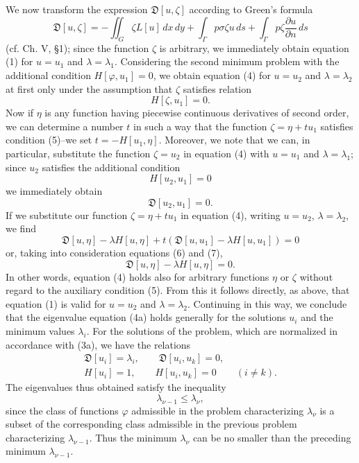 We now transform the expression $\mathfrak D[u,\zeta]$ according to Green's formula
\[
\mathfrak D[u,\zeta]=-
\iint_G \zeta L[u] \,dx\,dy
+\int_\Gamma p\sigma\zeta u\,ds
+\int_\Gamma p\zeta\frac{\partial u}{\partial n}\,ds
\]
(cf. Ch. V, \S1); since the function $\zeta$ is arbitrary, we immediately obtain equation (1) for $u=u_1$ and $\lambda=\lambda_1$. Considering the second minimum problem with the additional condition $H[\varphi,u_1]=0$, we obtain equation (4) for $u=u_2$ and $\lambda=\lambda_2$ at first only under the assumption that $\zeta$ satisfies relation
\begin{equation}\tag{5}
H[\zeta,u_1]=0.
\end{equation}
Now if $\eta$ is any function having piecewise continuous derivatives of second order, we can determine a number $t$ in such a way that the function $\zeta=\eta+tu_1$ satisfies condition (5)--we set $t=-H[u_1,\eta]$. Moreover, we note that we can, in particular, substitute the function $\zeta=u_2$ in equation (4) with $u=u_1$ and $\lambda=\lambda_1$; since $u_2$ satisfies the additional condition
\begin{equation}\tag{6}
H[u_2,u_1]=0
\end{equation}
we immediately obtain
\begin{equation}\tag{7}
\mathfrak D[u_2,u_1]=0.
\end{equation}
If we substitute our function $\zeta=\eta+tu_1$ in equation (4), writing $u=u_2$, $\lambda=\lambda_2$, we find
\[
\mathfrak D[u,\eta]-\lambda H[u,\eta]
+t(\mathfrak D[u,u_1]-\lambda H[u,u_1])=0
\]
or, taking into consideration equations (6) and (7),
\begin{equation}\tag{4a}
\mathfrak D[u,\eta]-\lambda H[u,\eta]=0.
\end{equation}
In other words, equation (4) holds also for arbitrary functions $\eta$ or $\zeta$ without regard to the auxiliary condition (5). From this it follows directly, as above, that equation (1) is valid for $u=u_2$ and $\lambda=\lambda_2$. Continuing in this way, we conclude that the eigenvalue equation (4a) holds generally for the solutions $u_i$ and the minimum values $\lambda_i$. For the solutions of the problem, which are normalized in accordance with (3a), we have the relations
\begin{equation}\tag{8}
\begin{gathered}
\mathfrak D[u_i]=\lambda_i,\qquad \mathfrak D[u_i,u_k]=0,\\
H[u_i]=1,\qquad H[u_i,u_k]=0\qquad(i\ne k).
\end{gathered}
\end{equation}
The eigenvalues thus obtained satisfy the inequality
\begin{equation}\tag{9}
\lambda_{\nu-1}\le\lambda_\nu,
\end{equation}
since the class of functions $\varphi$ admissible in the problem characterizing $\lambda_\nu$ is a subset of the corresponding class admissible in the previous problem characterizing $\lambda_{\nu-1}$. Thus the minimum $\lambda_\nu$ can be no smaller than the preceding minimum $\lambda_{\nu-1}$.

